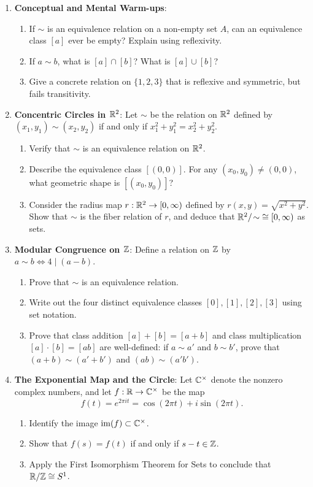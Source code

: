 \begin{enumerate}
  \item \textbf{Conceptual and Mental Warm-ups}:
  \begin{enumerate}
    \item If $\sim$ is an equivalence relation on a non-empty set $A$, can an equivalence class $[a]$ ever be empty? Explain using reflexivity.
    \item If $a \sim b$, what is $[a] \cap [b]$? What is $[a] \cup [b]$?
    \item Give a concrete relation on $\{1, 2, 3\}$ that is reflexive and symmetric, but fails transitivity.
  \end{enumerate}

  \item \textbf{Concentric Circles in $\mathbb{R}^2$}:
  Let $\sim$ be the relation on $\mathbb{R}^2$ defined by $(x_1, y_1) \sim (x_2, y_2)$ if and only if $x_1^2 + y_1^2 = x_2^2 + y_2^2$.
  \begin{enumerate}
    \item Verify that $\sim$ is an equivalence relation on $\mathbb{R}^2$.
    \item Describe the equivalence class $[(0, 0)]$. For any $(x_0, y_0) \neq (0, 0)$, what geometric shape is $[(x_0, y_0)]$?
    \item Consider the radius map $r: \mathbb{R}^2 \to [0, \infty)$ defined by $r(x, y) = \sqrt{x^2 + y^2}$. Show that $\sim$ is the fiber relation of $r$, and deduce that $\mathbb{R}^2/\!\sim\; \cong [0, \infty)$ as sets.
  \end{enumerate}

  \item \textbf{Modular Congruence on $\mathbb{Z}$}:
  Define a relation on $\mathbb{Z}$ by $a \sim b \iff 4 \mid (a - b)$.
  \begin{enumerate}
    \item Prove that $\sim$ is an equivalence relation.
    \item Write out the four distinct equivalence classes $[0], [1], [2], [3]$ using set notation.
    \item Prove that class addition $[a] + [b] = [a+b]$ and class multiplication $[a] \cdot [b] = [ab]$ are well-defined: if $a \sim a'$ and $b \sim b'$, prove that $(a+b) \sim (a'+b')$ and $(ab) \sim (a'b')$.
  \end{enumerate}

  \item \textbf{The Exponential Map and the Circle}:
  Let $\mathbb{C}^\times$ denote the nonzero complex numbers, and let $f: \mathbb{R} \to \mathbb{C}^\times$ be the map
  \[
  f(t) = e^{2\pi i t} = \cos(2\pi t) + i \sin(2\pi t).
  \]
  \begin{enumerate}
    \item Identify the image $\operatorname{im}(f) \subset \mathbb{C}^\times$.
    \item Show that $f(s) = f(t)$ if and only if $s - t \in \mathbb{Z}$.
    \item Apply the First Isomorphism Theorem for Sets to conclude that $\mathbb{R}/\mathbb{Z} \cong S^1$.
  \end{enumerate}


\end{enumerate}
